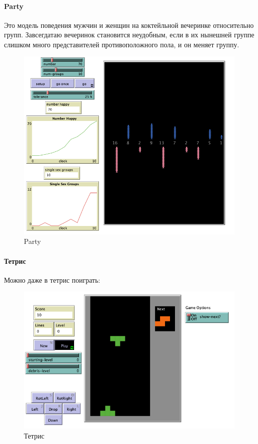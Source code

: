 \documentclass[14pt,a4paper,report]{report}
\begin{document}
\paragraph{Party}
Это модель поведения мужчин и женщин на  коктейльной вечеринке относительно групп. Завсегдатаю вечеринок становится неудобным, если в их нынешней группе слишком много представителей противоположного пола, и он меняет группу. 

\begin{figure}[h!]
	\centering
	\includegraphics[scale = 0.49]{images/12.png}
	\caption{Party}
\end{figure}


\clearpage

\paragraph{Тетрис}
Можно даже в тетрис поиграть:
\begin{figure}[h!]
	\centering
	\includegraphics[scale = 0.49]{images/13.png}
	\caption{Тетрис}
\end{figure}
\end{document}
